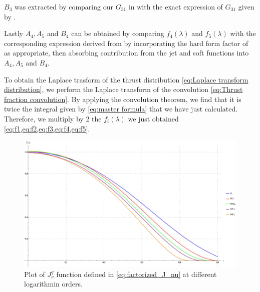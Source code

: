 \documentclass[../main.tex]{subfiles}
\begin{document}
$B_3$ was extracted by comparing our $G_{31}$ in  with the exact expression of $G_{31}$ given by \cite{Monni:2011gb}.

Lastly $A_4, A_5$ and $B_4$ can be obtained by comparing $f_4(\lambda)$ and $f_5(\lambda)$ with the corresponding expression derived from \cite{Ju_2023} by incorporating the hard form factor 
of \cite{chakraborty2022hbbarbvertexloopshard} as appropriate, then absorbing contribution from the jet and soft functions into $A_4,A_5$ and $B_4$.

To obtain the Laplace trasform of the thrust distribution \cref{eq:Laplace transform distribution}, 
we perform the Laplace transform of the convolution \cref{eq:Thrust fraction convolution}.
By applying the convolution theorem, we find that it is twice the integral given by \cref{eq:master formula} that we have just calculated. 
Therefore, we multiply by 2 the $f_i(\lambda)$ we just obtained \cref{eq:f1,eq:f2,eq:f3,eq:f4,eq:f5}.

\begin{figure}[htbp]
    \centering
    \includegraphics[width=\textwidth]{figures/Laplace_J_orders.png}
    \caption{Plot of $J_\nu^q$ function defined in \cref{eq:factorized_J_nu} at different logarithmin orders.}
    \label{fig:J_nu}
\end{figure}
\end{document}
